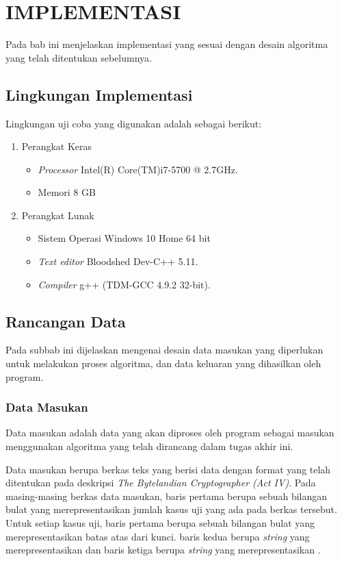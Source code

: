 \chapter{IMPLEMENTASI}
  Pada bab ini menjelaskan implementasi yang sesuai dengan desain algoritma yang telah ditentukan sebelumnya.
  
  \section{Lingkungan Implementasi}
  Lingkungan uji coba yang digunakan adalah sebagai berikut:
  \begin{enumerate}
  \item Perangkat Keras
  	\begin{itemize}
  		\item \textit{Processor} Intel(R) Core(TM)i7-5700 @ 2.7GHz.
  		\item Memori 8 GB
  	\end{itemize}
  	\item Perangkat Lunak
  		\begin{itemize}
  		\item Sistem Operasi Windows 10 Home 64 bit
  		\item \textit{Text editor} Bloodshed Dev-C++ 5.11.
		\item \textit{Compiler} g++ (TDM-GCC 4.9.2 32-bit).
  		\end{itemize}
  \end{enumerate}
  \section{Rancangan Data}
Pada subbab ini dijelaskan mengenai desain data masukan yang
diperlukan untuk melakukan proses algoritma, dan data keluaran
yang dihasilkan oleh program.

\subsection{Data Masukan}
Data masukan adalah data yang akan diproses oleh program sebagai masukan menggunakan algoritma yang telah dirancang dalam tugas akhir ini.

Data masukan berupa berkas teks yang berisi data dengan format yang telah ditentukan pada deskripsi \textit{The Bytelandian Cryptographer (Act IV)}. Pada masing-masing berkas data masukan, baris pertama berupa sebuah bilangan bulat yang merepresentasikan jumlah kasus uji yang ada pada berkas tersebut. Untuk setiap kasus uji, baris pertama berupa sebuah bilangan bulat yang merepresentasikan batas atas dari kunci. baris kedua berupa \textit{string} yang merepresentasikan \plaintext dan baris ketiga berupa \textit{string} yang merepresentasikan \ciphertext.


